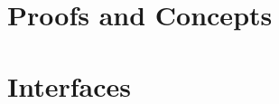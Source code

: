 \documentclass[a4paper,11pt]{article}
\begin{document}






\pagebreak
\appendix

\section{Proofs and Concepts}













\section{Interfaces}











\end{document}
